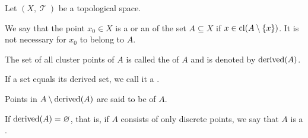 \begin{definition}\label{def:topological_derived_set}
  Let \( (X, \mscrT) \) be a topological space.

  \begin{thmenum}
     We say that the point \( x_0 \in X \) is a  or an  of the set \( A \subseteq X \) if \( x \in \operatorname{cl}(A \setminus \{ x \}) \). It is not necessary for \( x_0 \) to belong to \( A \).

     The set of all cluster points of \( A \) is called the  of \( A \) and is denoted by \( \operatorname{derived}(A) \).

     If a set equals its derived set, we call it a .

     Points in \( A \setminus \operatorname{derived}(A) \) are said to be  of \( A \).

     If \( \operatorname{derived}(A) = \varnothing \), that is, if \( A \) consists of only discrete points, we say that \( A \) is a .
  \end{thmenum}
\end{definition}

